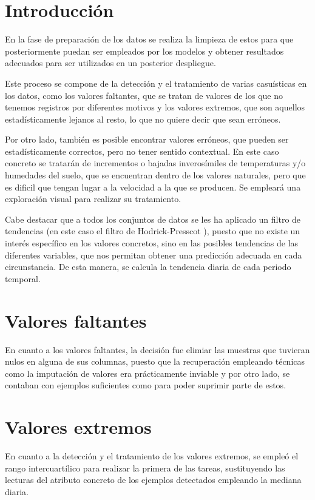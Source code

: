 
\section{Introducción}
En la fase de preparación de los datos se realiza la limpieza de estos para 
que posteriormente puedan ser empleados por los modelos y obtener resultados adecuados
para ser utilizados en un posterior despliegue.

Este proceso se compone de la detección y el tratamiento de varias casuísticas en 
los datos, como los valores faltantes, que se tratan de valores de los que no tenemos
registros por diferentes motivos y los valores extremos, que son aquellos
estadísticamente lejanos al resto, lo que no quiere decir que sean erróneos.

Por otro lado, también es posible encontrar valores erróneos, que pueden ser 
estadísticamente correctos, pero no tener sentido contextual. En este
caso concreto se tratarán de incrementos o bajadas inverosímiles de temperaturas 
y/o humedades del suelo, que se encuentran dentro de los valores naturales,
pero que es dificil que tengan lugar a la velocidad a la que se producen.
Se empleará una exploración visual para realizar su tratamiento. 

Cabe destacar que a todos los conjuntos de datos se les ha aplicado un filtro de 
tendencias (en este caso el filtro de Hodrick-Presscot \cite{misc:wikipediaHodrick2023}), 
puesto que no existe un interés específico en los valores concretos, sino en las posibles 
tendencias de las diferentes variables, que nos permitan obtener una predicción adecuada 
en cada circunstancia.
De esta manera, se calcula la tendencia diaria de cada periodo temporal.

\section{Valores faltantes}
En cuanto a los valores faltantes, la decisión fue elimiar las muestras que tuvieran
nulos en alguna de sus columnas, puesto que la recuperación empleando técnicas
como la imputación de valores era prácticamente inviable y por otro lado, se contaban
con ejemplos suficientes como para poder suprimir parte de estos.

\section{Valores extremos}
En cuanto a la detección y el tratamiento de los valores extremos, se empleó el 
rango intercuartílico para realizar la primera de las tareas, sustituyendo las lecturas
del atributo concreto de los ejemplos detectados empleando la mediana diaria.

